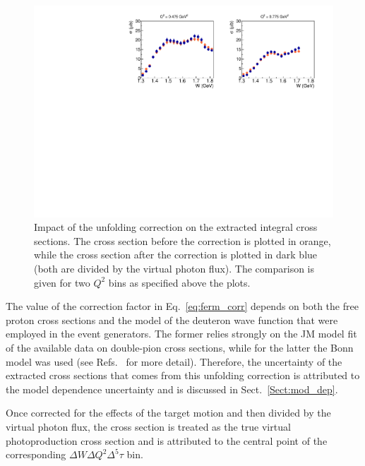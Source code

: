 \begin{figure}[htp]
\begin{center}
\includegraphics[width=14cm]{pictures/corrections/fermi_cor_nocor_int.pdf}
\caption{\small Impact of the unfolding correction on the extracted integral cross sections. The cross section before the correction is plotted in orange, while the cross section after the correction is plotted in dark blue (both are divided by the virtual photon flux). The comparison is given for two $Q^{2}$ bins as specified above the plots. } \label{ferm_cor_nocor_int}
\end{center}
\end{figure}

The value of the correction factor in Eq.~\eqref{eq:ferm_corr} depends on both the free proton cross sections and the model of the deuteron wave function that were employed in the event generators. The former relies strongly on the JM model fit of the available data on double-pion cross sections, while for the latter the Bonn model was used (see Refs.~\cite{twopeg,twopeg-d} for more detail). Therefore, the uncertainty of the extracted cross sections that comes from this unfolding correction is attributed to the model dependence uncertainty and is discussed in Sect.~\ref{Sect:mod_dep}. 

Once corrected for the effects of the target motion and then divided by the virtual photon flux, the cross section is treated as the true virtual photoproduction cross section and is attributed to the central point of the corresponding $\Delta W \Delta Q^{2}\Delta^{5}\tau$ bin.


